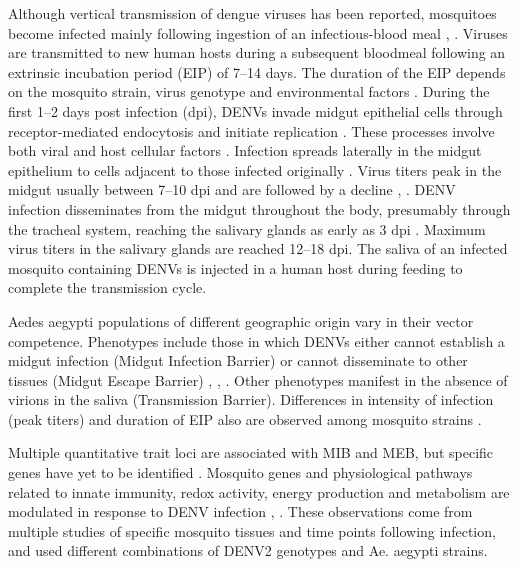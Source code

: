 Although vertical transmission of dengue viruses has been reported, mosquitoes become infected mainly following ingestion of an infectious-blood meal \cite{Gunther2007}, \cite{Angel2008}.
Viruses are transmitted to new human hosts during a subsequent bloodmeal following an extrinsic incubation period (EIP) of 7–14 days.
The duration of the EIP depends on the mosquito strain, virus genotype and environmental factors \cite{Watts1987}\cite{Black2002}\cite{Anderson2006}\cite{Salazar2007}\cite{Lambrechts2011}.
During the first 1–2 days post infection (dpi), DENVs invade midgut epithelial cells through receptor-mediated endocytosis and initiate replication \cite{Bennett2002}\cite{Heinz2003}\cite{Rey2003}\cite{Mercado-Curiel2008}.
These processes involve both viral and host cellular factors \cite{Samsa2009}.
Infection spreads laterally in the midgut epithelium to cells adjacent to those infected originally \cite{Salazar2007}.
Virus titers peak in the midgut usually between 7–10 dpi and are followed by a decline \cite{Salazar2007}, \cite{Xi2008}.
DENV infection disseminates from the midgut throughout the body, presumably through the tracheal system, reaching the salivary glands as early as 3 dpi \cite{Salazar2007}.
Maximum virus titers in the salivary glands are reached 12–18 dpi.
The saliva of an infected mosquito containing DENVs is injected in a human host during feeding to complete the transmission cycle.

Aedes aegypti populations of different geographic origin vary in their vector competence.
Phenotypes include those in which DENVs either cannot establish a midgut infection (Midgut Infection Barrier) or cannot disseminate to other tissues (Midgut Escape Barrier) \cite{Black2002}, \cite{Gubler1976}, \cite{Cox2011}.
Other phenotypes manifest in the absence of virions in the saliva (Transmission Barrier).
Differences in intensity of infection (peak titers) and duration of EIP also are observed among mosquito strains \cite{Salazar2007}.

Multiple quantitative trait loci are associated with MIB and MEB, but specific genes have yet to be identified \cite{Black2002}.
Mosquito genes and physiological pathways related to innate immunity, redox activity, energy production and metabolism are modulated in response to DENV infection \cite{Xi2008}, \cite{Sanchez-Vargas2009}\cite{Sim2010}\cite{Tchankouo-Nguetcheu2010}\cite{Luplertlop2011}\cite{Behura2011}\cite{Sim2012}\cite{Colpitts2011}.
These observations come from multiple studies of specific mosquito tissues and time points following infection, and used different combinations of DENV2 genotypes and Ae. aegypti strains.

